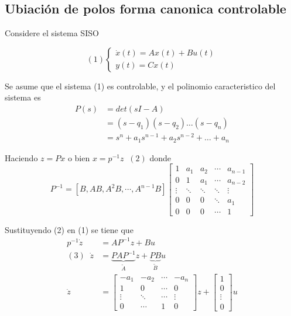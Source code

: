 \subsection{Ubiación de polos forma canonica controlable}

Considere el sistema SISO

\[
    (1)
    \left\{
        \begin{array}{lll}
            \dot{x}(t) = Ax(t) + Bu(t)\\
            y(t) = Cx(t)
        \end{array}
    \right.
\]

Se asume que el sistema (1) es controlable, y el polinomio caracteristico del sistema es 
\[
    \begin{split}
        P(s) & = det(sI-A) \\
        & = (s-q_{1}) ( s-q_{2}) \ldots (s-q_{n})\\
        & = s^{n} + a_{1}s^{n-1} + a_{2}s^{n-2} + \ldots + a_{n}
    \end{split}
\]

Haciendo \( z=Px \) o bien \( x=p^{-1}z \;\; (2)\) donde 
\[
    P^{-1} =
    [B, AB, A^{2}B, \cdots, A^{n-1}B ]
    \begin{bmatrix}
        1 & a_{1} & a_{2} & \cdots & a_{n-1} \\
        0 & 1 & a_{1} & \cdots & a_{n-2}\\
        \vdots & \ddots & \ddots & \ddots & \vdots\\
        0 & 0 & 0 & \ddots & a_{1}\\
        0 & 0 & 0 & \cdots & 1
    \end{bmatrix}
\]

Sustituyendo (2) en (1) se tiene que
\[
    \begin{split}
        p^{-1}\dot{z} & = AP^{-1}z + Bu\\
        (3)\;\;\dot{z} & = 
        \underbrace{PAP^{-1}}_{\tilde{A}}
        z + 
        \underbrace{PB}_{\tilde{B}}u \\
        \dot{z} & = 
        \begin{bmatrix}
            -a_{1} & -a_{2} & \cdots & -a_{n} \\
            1 & 0 & \cdots & 0 \\
            \vdots & \ddots & \cdots & \vdots \\
            0 & \cdots & 1 & 0
        \end{bmatrix} z
        +
        \begin{bmatrix}
            1\\ 0\\ \vdots \\ 0
        \end{bmatrix} u
    \end{split}
\]

